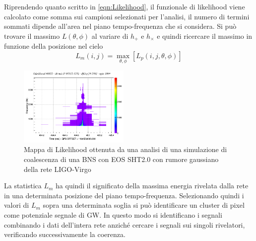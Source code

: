 Riprendendo quanto scritto in \ref{eqn:Likelihood}, il funzionale di likelihood viene calcolato come somma sui campioni selezionati per l'analisi, il numero di termini sommati dipende all'area nel piano tempo-frequenza che si considera. 
Si può trovare il massimo $L(\theta, \phi)$ al variare di $h_+$ e $h_\times$ e quindi ricercare il massimo in funzione della posizione nel cielo
\begin{equation}
	L_m(i,j)= \max_{\theta, \phi}[L_p(i,j,\theta,\phi)]
	\label{eqn:max_L}
\end{equation}
\begin{figure}
	\vspace{-15pt}
	\begin{center}
		\includegraphics[width=0.475\textwidth]{figures/Capitolo_2/l_tfmap_scalogram.png}
	\end{center}
	\vspace{-5pt}
	\caption{Mappa di Likelihood ottenuta da una analisi di una simulazione di coalescenza di una BNS con EOS SHT2.0 con rumore gaussiano della rete LIGO-Virgo}
	\label{fig:Likelihood_example}
	\vspace{-15pt}
\end{figure}
La statistica $L_m$ ha quindi il significato della massima energia rivelata dalla rete in una determinata posizione del piano tempo-frequenza.
Selezionando quindi i valori di $L_m$ sopra una determinata soglia si può identificare un cluster di pixel come potenziale segnale di GW. In questo modo si identificano i segnali combinando i dati dell'intera rete anziché cercare i segnali sui singoli rivelatori, verificando successivamente la coerenza.
